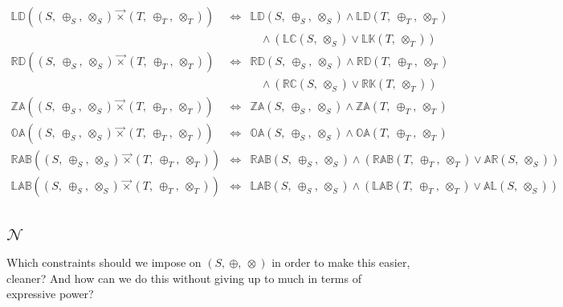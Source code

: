 \documentclass[10pt]{article}
\newcommand{\propname}[1]{{\mathbb{#1}}}
\newcommand{\lexprod}{\ensuremath{\mathbin{\vec{\times}}}}
\begin{document}
\[
\begin{array}{rcl} 
\propname{LD}((S,\ \oplus_S,\ \otimes_S) \lexprod (T,\ \oplus_T,\ \otimes_T)) 
   & \Leftrightarrow %
   & \propname{LD}(S,\ \oplus_S,\ \otimes_S) 
     \wedge \propname{LD}(T,\ \oplus_T,\ \otimes_T)\\ 
   & 
   & \ \ \ \ \wedge ( \propname{LC}(S,\ \otimes_S) \vee \propname{LK}(T,\ \otimes_T) )
  \\
\propname{RD}((S,\ \oplus_S,\ \otimes_S) \lexprod (T,\ \oplus_T,\ \otimes_T)) 
   & \Leftrightarrow %
  & \propname{RD}(S,\ \oplus_S,\ \otimes_S) 
    \wedge \propname{RD}(T,\ \oplus_T,\ \otimes_T) \\ 
   & 
   & \ \ \ \ \wedge ( \propname{RC}(S,\ \otimes_S) \vee \propname{RK}(T,\ \otimes_T) )
   \\ 
\propname{ZA}((S,\ \oplus_S,\ \otimes_S) \lexprod (T,\ \oplus_T,\ \otimes_T)) 
    & \Leftrightarrow %
    & \propname{ZA}(S,\ \oplus_S,\ \otimes_S) \wedge \propname{ZA}(T,\ \oplus_T,\ \otimes_T)
   \\
\propname{OA}((S,\ \oplus_S,\ \otimes_S) \lexprod (T,\ \oplus_T,\ \otimes_T)) 
    & \Leftrightarrow %
    & \propname{OA}(S,\ \oplus_S,\ \otimes_S) \wedge \propname{OA}(T,\ \oplus_T,\ \otimes_T)
   \\
\propname{RAB}((S,\ \oplus_S,\ \otimes_S) \lexprod (T,\ \oplus_T,\ \otimes_T)) 
    & \Leftrightarrow %
    & \propname{RAB}(S,\ \oplus_S,\ \otimes_S) \wedge  
      (\propname{RAB}(T,\ \oplus_T,\ \otimes_T) \vee \propname{AR}(S,\ \otimes_S)) 
    \\ 
\propname{LAB}((S,\ \oplus_S,\ \otimes_S) \lexprod (T,\ \oplus_T,\ \otimes_T)) 
    & \Leftrightarrow %
    & \propname{LAB}(S,\ \oplus_S,\ \otimes_S) \wedge  
      (\propname{LAB}(T,\ \oplus_T,\ \otimes_T) \vee \propname{AL}(S,\ \otimes_S)) 
    \\ 
\end{array} 
\]


\subsection{$\mathcal{N}$} 

Which constraints should we impose on $(S,\ \oplus,\ \otimes)$ in order 
to make this easier, cleaner? 
And how can we do this without giving up to much in terms of expressive power?
\end{document}
